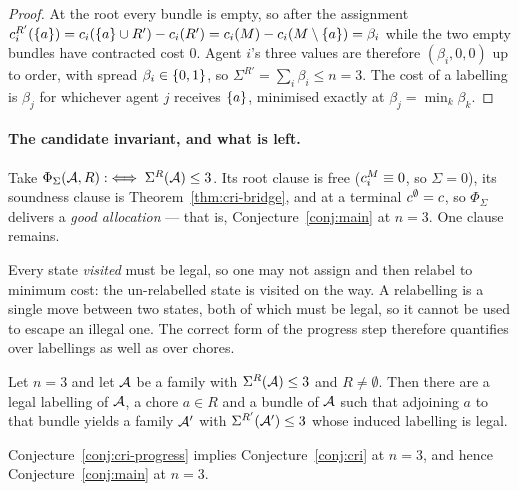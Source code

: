 \begin{proof}
At the root every bundle is empty, so after the assignment
$c^{R'}_i(\left\{a\right\}) = c_i(\left\{a\right\} \cup R') - c_i(R') =
c_i(M) - c_i(M \setminus \left\{a\right\}) = \beta_i$ while the two
empty bundles have contracted cost $0$. Agent $i$'s three values are therefore
$(\beta_i, 0, 0)$ up to order, with spread $\beta_i \in \left\{0,1\right\}$, so
$\Sigma^{R'} = \sum_i \beta_i \le n = 3$. The cost of a labelling is $\beta_j$
for whichever agent $j$ receives $\left\{a\right\}$, minimised exactly at
$\beta_j = \min_k \beta_k$.
\end{proof}

\paragraph{The candidate invariant, and what is left.} Take
$\Phi_{\Sigma}(\mathcal{A},R) :\iff \Sigma^{R}(\mathcal{A}) \le 3$. Its root clause is free
($c^{M}_i \equiv 0$, so $\Sigma = 0$), its soundness clause is
Theorem~\ref{thm:cri-bridge}, and at a terminal $c^{\emptyset} = c$, so
$\Phi_\Sigma$ delivers a \emph{good allocation} --- that is,
Conjecture~\ref{conj:main} at $n = 3$. One clause remains.

\begin{remark}
\label{rem:cri-labelling}
Every state \emph{visited} must be legal, so one may not assign and then relabel
to minimum cost: the un-relabelled state is visited on the way. A relabelling is
a single move between two states, both of which must be legal, so it cannot be
used to escape an illegal one. The correct form of the progress step therefore
quantifies over labellings as well as over chores.
\end{remark}

\begin{conjecture}
\label{conj:cri-progress}
Let $n = 3$ and let $\mathcal{A}$ be a family with $\Sigma^{R}(\mathcal{A}) \le 3$ and
$R \ne \emptyset$. Then there are a legal labelling of $\mathcal{A}$, a chore
$a \in R$ and a bundle of $\mathcal{A}$ such that adjoining $a$ to that bundle yields
a family $\mathcal{A}'$ with $\Sigma^{R'}(\mathcal{A}') \le 3$ whose induced labelling is
legal.
\end{conjecture}

\begin{proposition}
\label{prop:cri-progress-implies}
Conjecture~\ref{conj:cri-progress} implies Conjecture~\ref{conj:cri} at $n = 3$,
and hence Conjecture~\ref{conj:main} at $n = 3$.
\end{proposition}

